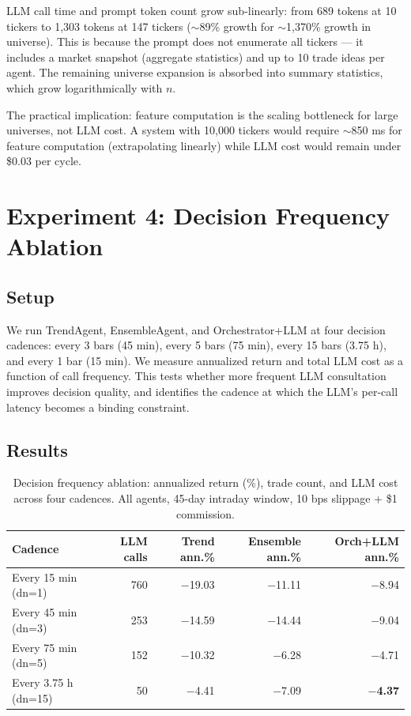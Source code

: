 \documentclass[10pt,conference]{IEEEtran}
\begin{document}
LLM call time and prompt token count grow sub-linearly: from 689 tokens at 10 tickers to 1,303 tokens at 147 tickers ($\sim$89\% growth for $\sim$1,370\% growth in universe). This is because the prompt does not enumerate all tickers --- it includes a market snapshot (aggregate statistics) and up to 10 trade ideas per agent. The remaining universe expansion is absorbed into summary statistics, which grow logarithmically with $n$.

The practical implication: feature computation is the scaling bottleneck for large universes, not LLM cost. A system with 10,000 tickers would require $\sim$850 ms for feature computation (extrapolating linearly) while LLM cost would remain under \$0.03 per cycle.


\section{Experiment 4: Decision Frequency Ablation}
\label{sec:exp4}

\subsection{Setup}

We run TrendAgent, EnsembleAgent, and Orchestrator+LLM at four decision cadences: every 3 bars (45 min), every 5 bars (75 min), every 15 bars (3.75 h), and every 1 bar (15 min). We measure annualized return and total LLM cost as a function of call frequency. This tests whether more frequent LLM consultation improves decision quality, and identifies the cadence at which the LLM's per-call latency becomes a binding constraint.

\subsection{Results}

\begin{table}[h]
    \centering
    \caption{Decision frequency ablation: annualized return (\%), trade count, and LLM cost across four cadences. All agents, 45-day intraday window, 10 bps slippage + \$1 commission.}
    \begin{tabular}{lrrrr}
        \toprule
        \textbf{Cadence} & \textbf{LLM calls} & \textbf{Trend ann.\%} & \textbf{Ensemble ann.\%} & \textbf{Orch+LLM ann.\%} \\
        \midrule
        Every 15 min  (dn=1)  & 760  & $-$19.03 & $-$11.11 & $-$8.94 \\
        Every 45 min  (dn=3)  & 253  & $-$14.59 & $-$14.44 & $-$9.04 \\
        Every 75 min  (dn=5)  & 152  & $-$10.32 & $-$6.28  & $-$4.71 \\
        Every 3.75 h  (dn=15) & 50   & $-$4.41  & $-$7.09  & \textbf{$-$4.37} \\
        \bottomrule
    \end{tabular}
    \label{tab:exp4_freq}
\end{table}
\end{document}
